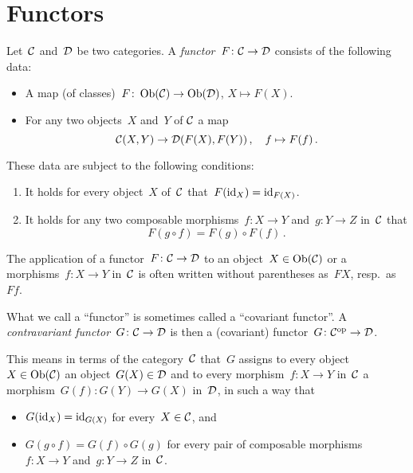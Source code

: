 \section{Functors}


\begin{definition}
  Let~$\mathcal{C}$ and~$\mathcal{D}$ be two categories.
  A \emph{functor}~$F \colon \mathcal{C} \to \mathcal{D}$ consists of the following data:
  \begin{itemize}
    \item
      A map (of classes)~$F \colon \operatorname{Ob}(\mathcal{C}) \to \operatorname{Ob}(\mathcal{D})$, $X \mapsto F(X)$.
    \item
      For any two objects~$X$ and~$Y$ of $\mathcal{C}$ a map
      \[
                \mathcal{C}(X, Y)
        \to     \mathcal{D}(F(X), F(Y)) \,,
        \quad   f
        \mapsto F(f) \,.
      \]
  \end{itemize}
  These data are subject to the following conditions:
  \begin{enumerate}[label=(F\arabic*)]
    \item
      It holds for every object~$X$ of~$\mathcal{C}$ that~$F(\operatorname{id}_X) = \operatorname{id}_{F(X)}$.
    \item
      It holds for any two composable morphisms~$f \colon X \to Y$ and~$g \colon Y \to Z$ in~$\mathcal{C}$ that
      \[
          F(g \circ f)
        = F(g) \circ F(f) \,.
      \]
  \end{enumerate}
\end{definition}


\begin{notation*}
  The application of a functor~$F \colon \mathcal{C} \to \mathcal{D}$ to an object~$X \in \operatorname{Ob}(\mathcal{C})$ or a morphisms~$f \colon X \to Y$ in~$\mathcal{C}$ is often written without parentheses as~$FX$, resp.\ as~$Ff$.
\end{notation*}


\begin{remark}
  What we call a \enquote{functor} is sometimes called a \enquote{covariant functor}.
  A \emph{contravariant functor}~$G \colon \mathcal{C} \to \mathcal{D}$ is then a (covariant) functor~$G \colon \mathcal{C}^{\mathrm{op}} \to \mathcal{D}$.
  
  This means in terms of the category~$\mathcal{C}$ that~$G$ assigns to every object~$X \in \operatorname{Ob}(\mathcal{C})$ an object~$G(X) \in \mathcal{D}$ and to every morphism~$f \colon X \to Y$ in~$\mathcal{C}$ a morphism~$G(f) \colon G(Y) \to G(X)$ in~$\mathcal{D}$, in such a way that
  \begin{itemize}
    \item
      $G(\operatorname{id}_X) = \operatorname{id}_{G(X)}$ for every~$X \in \mathcal{C}$, and
    \item
      $G(g \circ f) = G(f) \circ G(g)$ for every pair of composable morphisms~$f \colon X \to Y$ and~$g \colon Y \to Z$ in~$\mathcal{C}$.
  \end{itemize}
\end{remark}


